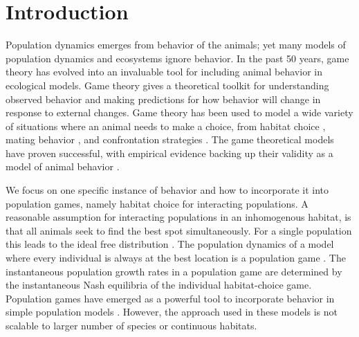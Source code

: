 \section{Introduction}
Population dynamics emerges from behavior of the animals; yet many models of population dynamics and ecosystems ignore behavior.  In the past 50 years, game theory has evolved into an invaluable tool for including animal behavior in ecological models. Game theory gives a theoretical toolkit for understanding observed behavior and making predictions for how behavior will change in response to external changes. Game theory has been used to model a wide variety of situations where an animal needs to make a choice, from habitat choice \citep{krivan1997dynamic, kondoh2003foraging,kvrivan2008ideal}, mating behavior  \citep{rapoport1967exploiter}, and confrontation strategies \citep{smith1973logic}. The game theoretical models have proven successful, with empirical evidence backing up their validity as a model of animal behavior \citep{cooper1989communication,empirical_trait,behavioral_effects}.


We focus on one specific instance of behavior and how to incorporate it into population games, namely habitat choice for interacting populations. A reasonable assumption for interacting populations in an inhomogenous habitat, is that all animals seek to find the best spot simultaneously. For a single population this leads to the ideal free distribution \citep{fretwell1969territorial}. The population dynamics of a model where every individual is always at the best location is a population game \citep{kvrivan2009evolutionary}. The instantaneous population growth rates in a population game are determined by the instantaneous Nash equilibria of the individual habitat-choice game. Population games have emerged as a powerful tool to incorporate behavior in simple population models \citep{Krivan1998,genkai2007macrophyte, cressman2010ideal,pinti2021co, gonzalez2003dynamic}. However, the approach used in these models is not scalable to larger number of species or continuous habitats.


